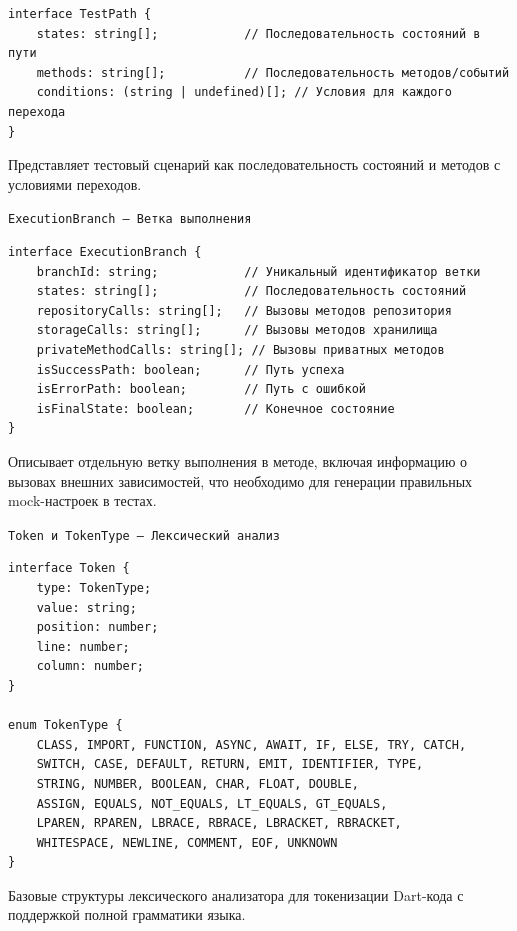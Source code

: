 \documentclass[14pt, russian]{scrartcl}
\begin{document}
\begin{verbatim}
interface TestPath {
    states: string[];            // Последовательность состояний в пути
    methods: string[];           // Последовательность методов/событий
    conditions: (string | undefined)[]; // Условия для каждого перехода
}
\end{verbatim}

Представляет тестовый сценарий как последовательность состояний и методов с условиями переходов.

\texttt{ExecutionBranch — Ветка выполнения}

\begin{verbatim}
interface ExecutionBranch {
    branchId: string;            // Уникальный идентификатор ветки
    states: string[];            // Последовательность состояний
    repositoryCalls: string[];   // Вызовы методов репозитория
    storageCalls: string[];      // Вызовы методов хранилища
    privateMethodCalls: string[]; // Вызовы приватных методов
    isSuccessPath: boolean;      // Путь успеха
    isErrorPath: boolean;        // Путь с ошибкой
    isFinalState: boolean;       // Конечное состояние
}
\end{verbatim}

Описывает отдельную ветку выполнения в методе, включая информацию о вызовах внешних зависимостей, что необходимо для генерации правильных mock-настроек в тестах.

\texttt{Token и TokenType — Лексический анализ}

\begin{verbatim}
interface Token {
    type: TokenType;
    value: string;
    position: number;
    line: number;
    column: number;
}

enum TokenType {
    CLASS, IMPORT, FUNCTION, ASYNC, AWAIT, IF, ELSE, TRY, CATCH,
    SWITCH, CASE, DEFAULT, RETURN, EMIT, IDENTIFIER, TYPE,
    STRING, NUMBER, BOOLEAN, CHAR, FLOAT, DOUBLE,
    ASSIGN, EQUALS, NOT_EQUALS, LT_EQUALS, GT_EQUALS,
    LPAREN, RPAREN, LBRACE, RBRACE, LBRACKET, RBRACKET,
    WHITESPACE, NEWLINE, COMMENT, EOF, UNKNOWN
}
\end{verbatim}

Базовые структуры лексического анализатора для токенизации Dart-кода с поддержкой полной грамматики языка.
\end{document}
